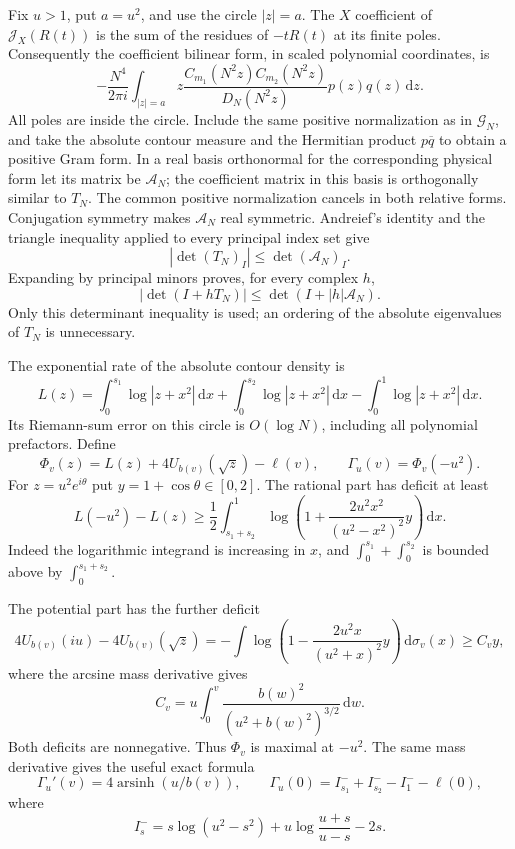 \documentclass[11pt]{article}
\theoremstyle{definition}\newtheorem{definition}[theorem]{Definition}
\theoremstyle{remark}\newtheorem{remark}[theorem]{Remark}
\begin{document}
Fix $u>1$, put $a=u^2$, and use the circle $|z|=a$.  The $X$ coefficient
of $\mathcal J_X(R(t))$ is the sum of the residues of $-tR(t)$ at its
finite poles.  Consequently the coefficient bilinear form, in scaled
polynomial coordinates, is
\[
 -\frac{N^4}{2\pi i}\int_{|z|=a}
 z\frac{C_{m_1}(N^2z)C_{m_2}(N^2z)}{D_N(N^2z)}p(z)q(z)\,\mathrm dz.
\]
All poles are inside the circle.  Include the same positive normalization
as in $\mathcal G_N$, and take the absolute contour measure and the
Hermitian product $p\overline q$ to obtain a positive Gram form.
In a real basis orthonormal for the corresponding physical form let its
matrix be $\mathcal A_N$; the coefficient matrix in this basis is
orthogonally similar to $T_N$.  The common positive normalization cancels
in both relative forms.  Conjugation symmetry makes $\mathcal A_N$ real
symmetric.  Andreief's identity and
the triangle inequality applied to every principal index set give
\[
 |\det(T_N)_I|\le\det(\mathcal A_N)_I.
\]
Expanding by principal minors proves, for every complex $h$,
\begin{equation}\label{z3a:majorant}
 |\det(I+hT_N)|\le\det(I+|h|\mathcal A_N).
\end{equation}
Only this determinant inequality is used; an ordering of the absolute
eigenvalues of $T_N$ is unnecessary.

The exponential rate of the absolute contour density is
\[
 L(z)=\int_0^{s_1}\log|z+x^2|\,\mathrm dx
     +\int_0^{s_2}\log|z+x^2|\,\mathrm dx
     -\int_0^1\log|z+x^2|\,\mathrm dx.
\]
Its Riemann-sum error on this circle is $O(\log N)$, including all
polynomial prefactors.  Define
\[
 \Phi_v(z)=L(z)+4U_{b(v)}(\sqrt z)-\ell(v),\qquad
 \Gamma_u(v)=\Phi_v(-u^2).
\]
For $z=u^2e^{i\theta}$ put $y=1+\cos\theta\in[0,2]$.  The rational part
has deficit at least
\begin{equation}\label{z3a:rational-deficit}
 L(-u^2)-L(z)\ge\frac12\int_{s_1+s_2}^1
 \log\left(1+\frac{2u^2x^2}{(u^2-x^2)^2}y\right)\,\mathrm dx.
\end{equation}
Indeed the logarithmic integrand is increasing in $x$, and
$\int_0^{s_1}+\int_0^{s_2}$ is bounded above by $\int_0^{s_1+s_2}$.

The potential part has the further deficit
\[
 4U_{b(v)}(iu)-4U_{b(v)}(\sqrt z)
 =-\int\log\left(1-\frac{2u^2x}{(u^2+x)^2}y\right)
                 \,\mathrm d\sigma_v(x)
 \ge C_vy,
\]
where the arcsine mass derivative gives
\begin{equation}\label{z3a:linear}
 C_v=u\int_0^v\frac{b(w)^2}{(u^2+b(w)^2)^{3/2}}\,\mathrm dw.
\end{equation}
Both deficits are nonnegative.  Thus $\Phi_v$ is maximal at $-u^2$.
The same mass derivative gives the useful exact formula
\begin{equation}\label{z3a:Gamma}
 \Gamma_u'(v)=4\operatorname{arsinh}(u/b(v)),\qquad
 \Gamma_u(0)=I^-_{s_1}+I^-_{s_2}-I^-_1-\ell(0),
\end{equation}
where
\[
 I^-_s=s\log(u^2-s^2)+u\log\frac{u+s}{u-s}-2s.
\]
\end{document}
